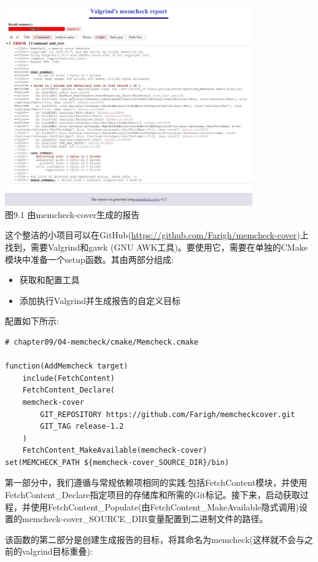 \begin{center}
\includegraphics[width=0.8\textwidth]{content/3/chapter9/images/1.jpg}\\
图9.1 由memcheck-cover生成的报告
\end{center}

这个整洁的小项目可以在GitHub(\url{https://github.com/Farigh/memcheck-cover})上找到，需要Valgrind和gawk (GNU AWK工具)。要使用它，需要在单独的CMake模块中准备一个setup函数。其由两部分组成:

\begin{itemize}
\item 
获取和配置工具

\item 
添加执行Valgrind并生成报告的自定义目标
\end{itemize}

配置如下所示:

\begin{lstlisting}[style=styleCMake]
# chapter09/04-memcheck/cmake/Memcheck.cmake

function(AddMemcheck target)
	include(FetchContent)
	FetchContent_Declare(
	memcheck-cover
		GIT_REPOSITORY https://github.com/Farigh/memcheckcover.git
		GIT_TAG release-1.2
	)
	FetchContent_MakeAvailable(memcheck-cover)
set(MEMCHECK_PATH ${memcheck-cover_SOURCE_DIR}/bin)
\end{lstlisting}

第一部分中，我们遵循与常规依赖项相同的实践:包括FetchContent模块，并使用FetchContent\_Declare指定项目的存储库和所需的Git标记。接下来，启动获取过程，并使用FetchContent\_Populate(由FetchContent\_MakeAvailable隐式调用)设置的memcheck-cover\_SOURCE\_DIR变量配置到二进制文件的路径。

该函数的第二部分是创建生成报告的目标，将其命名为memcheck(这样就不会与之前的valgrind目标重叠):

